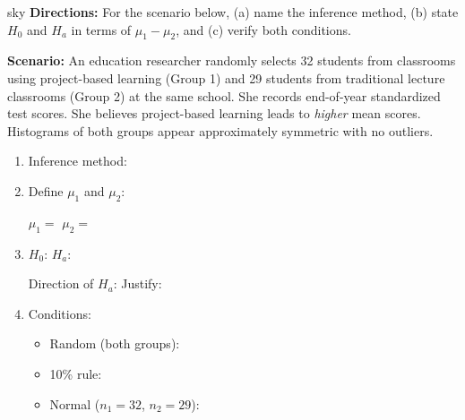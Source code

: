 \documentclass[10pt]{article}
\begin{document}
\begin{scenariobox}{sky}
\textbf{Directions:} For the scenario below, (a) name the inference method, (b) state $H_0$
and $H_a$ in terms of $\mu_1 - \mu_2$, and (c) verify both conditions.

\medskip
\textbf{Scenario:} An education researcher randomly selects 32 students from classrooms using
project-based learning (Group 1) and 29 students from traditional lecture classrooms (Group 2)
at the same school. She records end-of-year standardized test scores. She believes project-based
learning leads to \emph{higher} mean scores. Histograms of both groups appear approximately
symmetric with no outliers.

\begin{enumerate}[label=\alph*.]
  \item Inference method: 
  \item Define $\mu_1$ and $\mu_2$:

        $\mu_1 = $  \qquad
        $\mu_2 = $ 

  \item $H_0$:  \qquad $H_a$: 

        Direction of $H_a$:  \quad Justify: 

  \item Conditions:
        \begin{itemize}
          \item Random (both groups): 
          \item 10\% rule: 
          \item Normal ($n_1 = 32$, $n_2 = 29$): 
        \end{itemize}
\end{enumerate}
\end{scenariobox}
\end{document}
